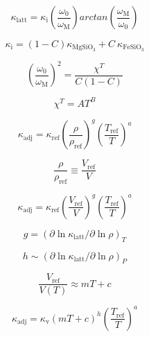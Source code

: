 \pagebreak






$$\kappa_{\mathrm{latt}}=\kappa_{\mathrm{i}}\left ( \frac{\omega_{\mathrm{0}}}{\omega_{\mathrm{M}}} \right )arctan\left ( \frac{\omega_{\mathrm{M}}}{\omega_{\mathrm{0}}} \right )$$

$$\kappa_{\mathrm{i}}=\left ( 1-C \right )\kappa_{\mathrm{MgSiO_{3}}}+C\ \kappa_{\mathrm{FeSiO_{3}}}$$

$$\left ( \frac{\omega_{\mathrm{0}}}{\omega_{\mathrm{M}}} \right )^{2}=\frac{\chi^{T}}{C\left ( 1-C \right )}$$

$$\chi^{T}=A T^{B}$$

$$\kappa_{\mathrm{adj}}=\kappa_{\mathrm{ref}}\left ( \frac{\rho}{\rho_{\mathrm{ref}}} \right )^{g}\left ( \frac{T_{\mathrm{ref}}}{T} \right )^{a}$$

$$\frac{\rho }{\rho _{\mathrm{ref}}} \equiv \frac{V_{\mathrm{ref}}}{V}$$%

$$\kappa_{\mathrm{adj}}=\kappa_{\mathrm{ref}}\left ( \frac{V_{\mathrm{ref}}}{V} \right )^{g}\left ( \frac{T_{\mathrm{ref}}}{T} \right )^{a}$$

$$g=\left( \partial \ln \kappa_{\mathrm{latt}} / \partial \ln \rho \right) _{T}$$

$$h \sim \left( \partial \ln \kappa_{\mathrm{latt}} / \partial \ln \rho \right) _{P}$$

$$\frac{V_{\mathrm{ref}}}{V(T)} \approx  mT+c$$

$$\kappa_{\mathrm{adj}}=\kappa_{\mathrm{v}} \left ( mT+c \right )^{h} \left ( \frac{T_{\mathrm{ref}}}{T} \right )^{a}$$



















